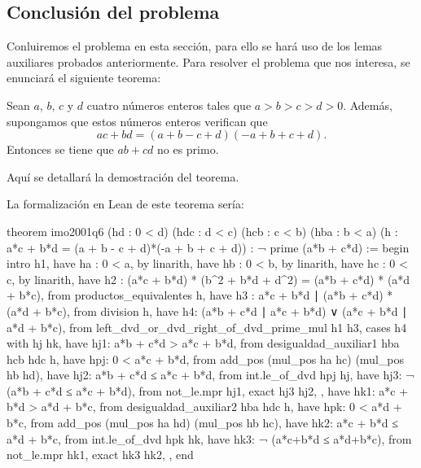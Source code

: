 \subsection{Conclusión del problema}
Conluiremos el problema en esta sección, para ello se hará uso de los lemas
auxiliares probados anteriormente. Para resolver el problema que nos
interesa, se enunciará el siguiente teorema:

\begin{teorema}[imo2001q6]
  Sean \(a\), \(b\), \(c\) y \(d\) cuatro
  números enteros tales que \(a > b > c > d > 0\). Además, supongamos que
  estos números enteros verifican que
    \begin{equation}
      ac+bd = (a+b-c+d)(-a+b+c+d).
    \end{equation}
    Entonces se tiene que \(ab+cd\) no es primo.
\end{teorema}
\begin{demostracion}
  Aquí se detallará la demostración del teorema.
\end{demostracion}

La formalización en Lean de este teorema sería:
\begin{leancode}
theorem imo2001q6
  (hd  : 0 < d)
  (hdc : d < c)
  (hcb : c < b)
  (hba : b < a)
  (h : a*c + b*d = (a + b - c + d)*(-a + b + c + d))
  : ¬ prime (a*b + c*d) :=
begin
  intro h1,
  have ha : 0 < a,
    by linarith,
  have hb : 0 < b,
    by linarith,
  have hc : 0 < c,
    by linarith,
  have h2 : (a*c + b*d) * (b^2 + b*d + d^2) =
            (a*b + c*d) * (a*d + b*c),
    from productos_equivalentes h,
  have h3 : a*c + b*d ∣ (a*b + c*d) * (a*d + b*c),
    from division h,
  have h4: (a*b + c*d ∣ a*c + b*d) ∨ (a*c + b*d  ∣ a*d + b*c),
    from left_dvd_or_dvd_right_of_dvd_prime_mul h1 h3,
  cases h4 with hj hk,
  { have hj1: a*b + c*d > a*c + b*d,
      from desigualdad_auxiliar1 hba hcb hdc h,
    have hpj: 0 < a*c + b*d,
      from add_pos (mul_pos ha hc) (mul_pos hb hd),
    have hj2: a*b + c*d ≤ a*c + b*d,
      from int.le_of_dvd hpj hj,
    have hj3: ¬ (a*b + c*d ≤ a*c + b*d),
      from not_le.mpr hj1,
    exact hj3 hj2, },
  { have hk1: a*c + b*d > a*d + b*c,
      from desigualdad_auxiliar2 hba hdc h,
    have hpk: 0 < a*d + b*c,
      from add_pos (mul_pos ha hd) (mul_pos hb hc),
    have hk2: a*c + b*d ≤ a*d + b*c,
      from int.le_of_dvd hpk hk,
    have hk3: ¬ (a*c+b*d ≤  a*d+b*c),
      from not_le.mpr hk1,
    exact hk3 hk2, },
end
\end{leancode}

